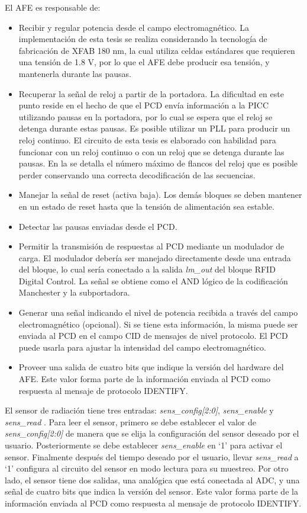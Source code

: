 \documentclass[a4paper, twoside, 11pt]{report}
\begin{document}
El AFE es responsable de:

\begin{itemize}
  \item Recibir y regular potencia desde el campo electromagnético. La implementación de esta tesis se realiza considerando la tecnología de fabricación de XFAB 180 nm, la cual utiliza celdas estándares que requieren una tensión de 1.8 V, por lo que el AFE debe producir esa tensión, y mantenerla durante las pausas.
  \item Recuperar la señal de reloj a partir de la portadora. La dificultad en este punto reside en el hecho de que el PCD envía información a la PICC utilizando pausas en la portadora, por lo cual se espera que el reloj se detenga durante estas pausas. Es posible utilizar un PLL para producir un reloj continuo. El circuito de esta tesis es elaborado con habilidad para funcionar con un reloj continuo o con un reloj que se detenga durante las pausas. En la  se detalla el número máximo de flancos del reloj que es posible perder conservando una correcta decodificación de las secuencias.
  \item Manejar la señal de reset (activa baja). Los demás bloques se deben mantener en un estado de reset hasta que la tensión de alimentación sea estable.
  \item Detectar las pausas enviadas desde el PCD.
  \item Permitir la transmisión de respuestas al PCD mediante un modulador de carga. El modulador debería ser manejado directamente desde una entrada del bloque, lo cual sería conectado a la salida \textit{lm\_out} del bloque RFID Digital Control. La señal se obtiene como el AND lógico de la codificación Manchester y la subportadora.
  \item Generar una señal indicando el nivel de potencia recibida a través del campo electromagnético (opcional). Si se tiene esta información, la misma puede ser enviada al PCD en el campo CID de mensajes de nivel protocolo. El PCD puede usarla para ajustar la intensidad del campo electromagnético.
  \item Proveer una salida de cuatro bits que indique la versión del hardware del AFE. Este valor forma parte de la información enviada al PCD como respuesta al mensaje de protocolo IDENTIFY.
\end{itemize}

El sensor de radiación tiene tres entradas: \textit{sens\_config[2:0]}, \textit{sens\_enable} y \textit{sens\_read} . Para leer el sensor, primero se debe establecer el valor de \textit{sens\_config[2:0]} de manera que se elija la configuración del sensor deseado por el usuario. Posteriormente se debe establecer \textit{sens\_enable} en ‘1’ para activar el sensor. Finalmente después del tiempo deseado por el usuario, llevar \textit{sens\_read} a ‘1’ configura al circuito del sensor en modo lectura para su muestreo. Por otro lado, el sensor tiene dos salidas, una analógica que está conectada al ADC, y una señal de cuatro bits que indica la versión del sensor. Este valor forma parte de la información enviada al PCD como respuesta al mensaje de protocolo IDENTIFY.
\end{document}
